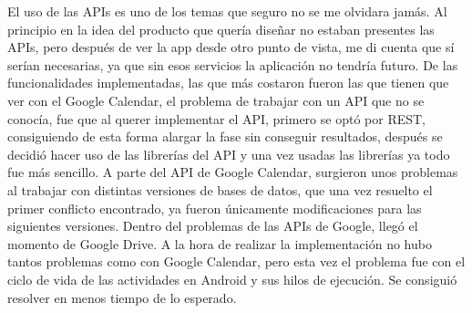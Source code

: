 El uso de las APIs es uno de los temas que seguro no se me olvidara jamás. Al principio en la idea del producto que quería diseñar no estaban presentes las APIs, pero después de ver la app desde otro punto de vista, me di cuenta que sí serían necesarias, ya que sin esos servicios la aplicación no tendría futuro.
De las funcionalidades implementadas, las que más costaron fueron las que tienen que ver con el Google Calendar, el problema de trabajar con un API que no se conocía, fue que al querer implementar el API, primero se optó por REST, consiguiendo de esta forma alargar la fase sin conseguir resultados, después se decidió hacer uso de las librerías del API y una vez usadas las librerías ya todo fue más sencillo. A parte del API de Google Calendar, surgieron unos problemas al trabajar con distintas versiones de bases de datos, que una vez resuelto el primer conflicto encontrado, ya fueron únicamente modificaciones para las siguientes versiones.
Dentro del problemas de las APIs de Google, llegó el momento de Google Drive. A la hora de realizar la implementación no hubo tantos problemas como con Google Calendar, pero esta vez el problema fue con el ciclo de vida de las actividades en Android y sus hilos de ejecución. Se consiguió resolver en menos tiempo de lo esperado.
